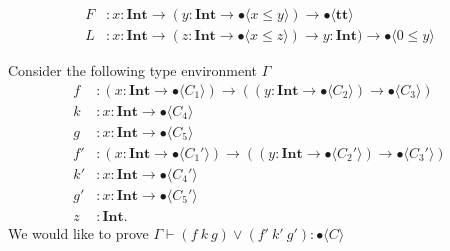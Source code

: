 \documentclass[runningheads]{llncs}
\newcommand \true {\textbf{tt}}
\newcommand \stypeint {\textbf{Int}}
\newcommand \stypebool {\bullet}
\newcommand \typeint[1]{{#1} : \stypeint}
\newcommand \typebool[1]{\stypebool \langle #1 \rangle}
\begin{document}
\begin{align*}
    F&: \typeint{x} \to (\typeint{y} \to \typebool{x \leq y}) \to
    \typebool{\true}\\
    L&: \typeint{x} \to (\typeint{z} \to \typebool{x \leq z}) \to
    \typeint{y}) \to \typebool{0 \leq y}
\end{align*}

Consider the following type environment \(\Gamma\)
\begin{align*}
    f&: (\typeint{x} \to \typebool{C_1}) \to ((\typeint{y} \to \typebool{C_2})
    \to \typebool{C_3})\\
    k&: \typeint{x} \to \typebool{C_4}\\
    g&: \typeint{x} \to \typebool{C_5}\\
    f'&: (\typeint{x} \to \typebool{C_1'}) \to ((\typeint{y} \to \typebool{C_2'})
    \to \typebool{C_3'})\\
    k'&: \typeint{x} \to \typebool{C_4'}\\
    g'&: \typeint{x} \to \typebool{C_5'}\\
    z&: \stypeint.
\end{align*}
We would like to prove \( \Gamma \vdash (f\ k\ g) \lor (f'\ k'\ g'):
\typebool{C}\)
\end{document}
